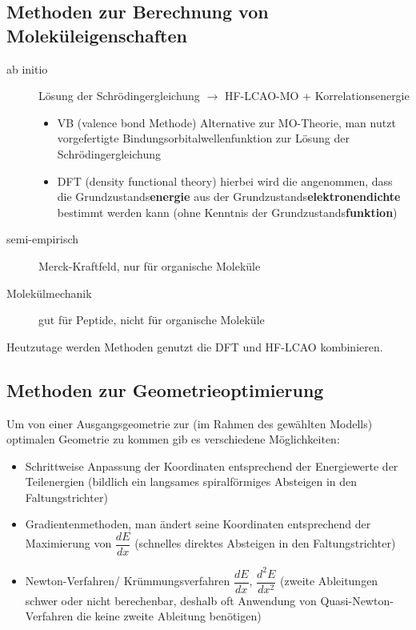 \documentclass[12pt,a4paper,oneside,normalheadings,abstracton,liststotoc,bibtotoc,titlepage,pdftex]{scrartcl}
\begin{document}
\subsection{Methoden zur Berechnung von Moleküleigenschaften}
\begin{description}
\item[ab initio] Lösung der Schrödingergleichung $\rightarrow$ HF-LCAO-MO + Korrelationsenergie
\begin{itemize}
\item VB (valence bond Methode) Alternative zur MO-Theorie, man nutzt vorgefertigte Bindungsorbitalwellenfunktion zur Lösung der Schrödingergleichung
\item DFT (density functional theory) hierbei wird die angenommen, dass die Grundzustands\textbf{energie} aus der Grundzustands\textbf{elektronendichte} bestimmt werden kann (ohne Kenntnis der Grundzustands\textbf{funktion})
\end{itemize}
\item[semi-empirisch] Merck-Kraftfeld, nur für organische Moleküle
\item[Molekülmechanik] gut für Peptide, nicht für organische Moleküle 
\end{description} 
Heutzutage werden Methoden genutzt die DFT und HF-LCAO kombinieren.

\subsection{Methoden zur Geometrieoptimierung}
Um von einer Ausgangsgeometrie zur (im Rahmen des gewählten Modells) optimalen Geometrie zu kommen gib es verschiedene Möglichkeiten:
\begin{itemize}
\item Schrittweise Anpassung der Koordinaten entsprechend der Energiewerte der Teilenergien (bildlich ein langsames spiralförmiges Absteigen in den Faltungstrichter)
\item Gradientenmethoden, man ändert seine Koordinaten entsprechend der Maximierung von $\dfrac{dE}{dx}$ (schnelles direktes Absteigen in den Faltungstrichter)
\item Newton-Verfahren/ Krümmungsverfahren $\dfrac{dE}{dx}$,  $\dfrac{d^2E}{dx^2}$ (zweite Ableitungen schwer oder nicht berechenbar, deshalb oft Anwendung von Quasi-Newton-Verfahren die keine zweite Ableitung benötigen)
\end{itemize}
\end{document}
